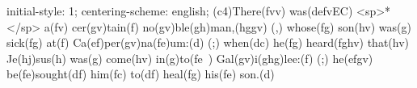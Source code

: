initial-style: 1;
centering-scheme: english;
(c4)There(fvv) was(defvEC) <sp>*</sp> a(fv) cer(gv)tain(f) no(gv)ble(gh)man,(hggv) (,) whose(fg) son(hv) was(g) sick(fg) at(f) Ca(ef)per(gv)na(fe)um:(d) (;) when(dc) he(fg) heard(fghv) that(hv) Je(hj)sus(h) was(g) come(hv) in(g)to(fe~) Gal(gv)i(ghg)lee:(f) (;) he(efgv) be(fe)sought(df) him(fc) to(df) heal(fg) his(fe) son.(d)
